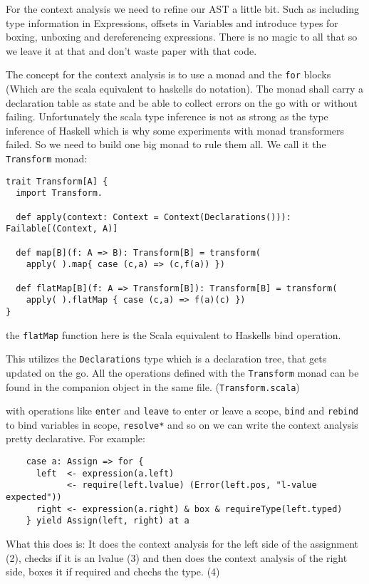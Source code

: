 \documentclass{style}
\begin{document}
For the context analysis we need to refine our AST a little bit. Such as including type information in Expressions, offsets in Variables and introduce types for boxing, unboxing and dereferencing expressions. There is no magic to all that so we leave it at that and don't waste paper with that code.

The concept for the context analysis is to use a monad and the \texttt{for} blocks (Which are the scala equivalent to haskells do notation). The monad shall carry a declaration table as state and be able to collect errors on the go with or without failing. Unfortunately the scala type inference is not as strong as the type inference of Haskell which is why some experiments with monad transformers failed. So we need to build one big monad to rule them all. We call it the \texttt{Transform} monad:

\begin{lstlisting}
trait Transform[A] {
  import Transform.

  def apply(context: Context = Context(Declarations())): Failable[(Context, A)]

  def map[B](f: A => B): Transform[B] = transform(
    apply( ).map{ case (c,a) => (c,f(a)) })

  def flatMap[B](f: A => Transform[B]): Transform[B] = transform(
    apply( ).flatMap { case (c,a) => f(a)(c) })
}
\end{lstlisting}

the \texttt{flatMap} function here is the Scala equivalent to Haskells bind operation.

This utilizes the \texttt{Declarations} type which is a declaration tree, that gets updated on the go. All the operations defined with the \texttt{Transform} monad can be found in the companion object in the same file. (\texttt{Transform.scala})

with operations like \texttt{enter} and \texttt{leave} to enter or leave a scope, \texttt{bind} and \texttt{rebind} to bind variables in scope, \texttt{resolve*} and so on we can write the context analysis pretty declarative. For example:

\begin{lstlisting}
    case a: Assign => for {
      left  <- expression(a.left)
            <- require(left.lvalue) (Error(left.pos, "l-value expected"))
      right <- expression(a.right) & box & requireType(left.typed)
    } yield Assign(left, right) at a    
\end{lstlisting}

What this does is: It does the context analysis for the left side of the assignment (2), checks if it is an lvalue (3) and then does the context analysis of the right side, boxes it if required and chechs the type. (4)
\end{document}
